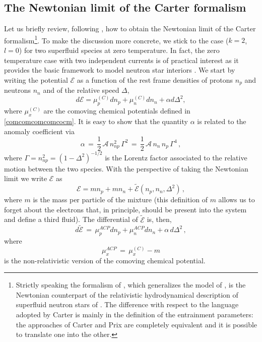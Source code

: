 \documentclass[usenatbib]{mnras}
\begin{document}
\subsection{The Newtonian limit of the Carter formalism}

Let us briefly review, following \cite{prix2004}, how to obtain the Newtonian limit of the Carter 
formalism\footnote{
Strictly speaking the formalism of \cite{prix2004}, which generalizes the model of \cite{pca2002}, is the Newtonian counterpart of the relativistic hydrodynamical description of superfluid neutron stars of \cite{prix2005}. The difference with respect to the language adopted by Carter is mainly in the definition of the entrainment parameters:  the approaches of Carter and Prix are completely equivalent and it is possible to translate one into the other.
}. 
To make the discussion more concrete, we stick to the case ($k=2$, $l=0$) for two superfluid species at zero temperature. In fact, the zero temperature case with two independent currents is of practical interest as it provides  the basic framework to model neutron star interiors \citep[see e.g. ][]{andersson_comer2000, and_com_lang_2002, prix2005, sourie2016PhRvD, antonelli+2018}.
We start by writing the potential $\mathcal{E}$ as a function of the rest frame densities of protons $n_p$ and neutrons $n_n$  and of the relative speed $\Delta$, 
%
\begin{equation}
d\mathcal{E} = \mu_p^{(C)} dn_p + \mu_n^{(C)} dn_n + \alpha d\Delta^2, 
\end{equation}
%
where $\mu_x^{(C)}$ are the comoving chemical potentials  defined in \ref{comcomcomcomcocm}. It is easy to show that the quantity $\alpha$ is related to the anomaly coefficient via
%
\begin{equation}
\label{tritone}
\alpha 
\,=\, 
\dfrac{1}{2} \, \mathcal{A} \, n_{np}^2 \, \Gamma^2 
\,=\, 
\dfrac{1}{2} \, \mathcal{A} \, n_n \, n_p \, \Gamma^4 
\, ,
\end{equation}
%
where $\Gamma=n_{np}^2=(1-\Delta^2)^{-1/2}$ is the Lorentz factor associated to the relative motion between the two species. With the perspective of taking the Newtonian limit we write $\mathcal{E}$ as
%
\begin{equation}
\mathcal{E} = m  n_p +m  n_n + \tilde{\mathcal{E}} (n_p,n_n,\Delta^2) \, ,
\end{equation}
%
where $m$ is the mass per particle of the mixture (this definition of $m$ allows us to forget about the electrons that, in principle, should be present into the system and define a third fluid).
 The differential of $\tilde{\mathcal{E}}$ is, then,
%
\begin{equation}
\label{iltildo}
d \tilde{\mathcal{E}} \, = \, \mu_p^{ACP} dn_p + \mu_n^{ACP}dn_n + \alpha \, d\Delta^2 \, ,
\end{equation}
%
where
%
\begin{equation}
\label{comovingchemicalsnewtonian}
\mu_x^{ACP} \, = \,  \mu_{x}^{(C)} - m 
\end{equation}
%
is the non-relativistic version of the comoving chemical potential. 
\end{document}
